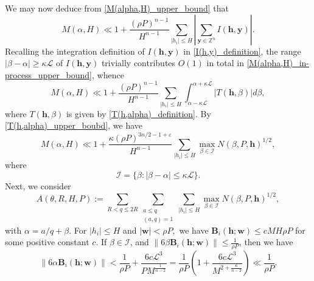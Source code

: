 \documentclass[12pt]{amsart}
\theoremstyle{definition}
\numberwithin{equation}{section}
\begin{document}
We may now deduce from \eqref{M(alpha,H)_upper_bound} that
\begin{equation}
    \label{M(alpha,H)_in-process_upper_bound}
    M(\alpha,H)\ll 1+\frac{(\rho P)^{n-1}}{H^{n-1}} \sum_{|h_i| \leq H} \left|\sum_{\boldsymbol{y}\in \mathbb{Z}^{n}} I(\boldsymbol{h}, \boldsymbol{y}) \right|.
\end{equation}
Recalling the integration definition of $I(\boldsymbol{h},\boldsymbol{y})$ in \eqref{I(h,y)_definition}, the range $|\beta-\alpha| \geq \kappa \mathcal{L}$ of 
 $I(\boldsymbol{h},\boldsymbol{y})$ trivially contributes $O(1)$ in total in \eqref{M(alpha,H)_in-process_upper_bound}, whence
\begin{equation*}
    M(\alpha,H)\ll 1+\frac{(\rho P)^{n-1}}{H^{n-1}} \sum_{|h_i| \leq H} \int_{\alpha-\kappa\mathcal{L}}^{\alpha+\kappa\mathcal{L}} \left|T(\boldsymbol{h},\beta) \right| d\beta,
\end{equation*}
where $T(\boldsymbol{h},\beta)$ is given by \eqref{T(h,alpha)_definition}. By \eqref{T(h,alpha)_upper_boubd}, we have
\begin{equation}
    \label{M(alpha,H)_final_upper_bound}
    M(\alpha,H)\ll 1+\frac{\kappa (\rho P)^{3n/2-1+\varepsilon}}{H^{n-1}} \sum_{|h_i| \leq H} \mathop{\max}_{\beta \in \mathcal{I}} N(\beta, P, \boldsymbol{h})^{1/2},
\end{equation}
where
\begin{equation}
    \mathcal{I}=\{ \beta: |\beta-\alpha| \leq \kappa \mathcal{L}\}.
\end{equation}
Next, we consider
\begin{equation}
    \label{A(theta,R,H,P)_definition}
    A(\theta, R, H, P) := \sum_{R <q \leq 2R}\sum_{\substack{a \leq q\\[3pt](a,q)=1}}\sum_{|h_i| \leq H} \mathop{\max}_{\beta \in \mathcal{I}} N(\beta, P, \boldsymbol{h})^{1/2},
\end{equation}
with $\alpha=a/q+\beta.$ For $|h_i| \leq H$ and $|\boldsymbol{w}| < \rho P,$ we have $\boldsymbol{B}_i(\boldsymbol{h};\boldsymbol{w}) \leq cMH\rho P$ for some positive constant $c$. If $\beta \in \mathcal{I}$, and $\left\|6\beta\boldsymbol{B}_i(\boldsymbol{h};\boldsymbol{w})\right\| \leq \frac{1}{\rho P}$, then we have
\begin{equation*}
    \left\|6\alpha\boldsymbol{B}_i(\boldsymbol{h};\boldsymbol{w})\right\| < \frac{1}{\rho P}+\frac{6c\mathcal{L}^3}{PM^{\frac{1}{n-2}}} =\frac{1}{\rho P}\left(1+\frac{6c\mathcal{L}^3}{M^{2+\frac{6}{n-2}}}\right) \ll \frac{1}{\rho P}.
\end{equation*}
\end{document}
